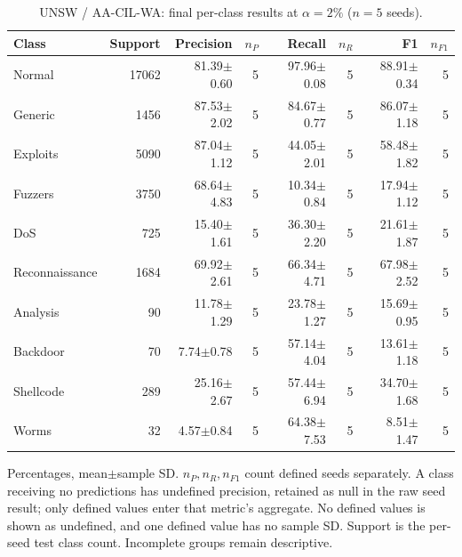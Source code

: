 \begin{table}[t]
\centering\scriptsize
\setlength{\tabcolsep}{3.3pt}
\caption{UNSW / AA-CIL-WA: final per-class results at $\alpha=2\%$ ($n=5$ seeds).}\label{tab:forgetting-class-unsw_nb15-aacil-wa}
\begin{tabular}{lrrrrrrr}
\toprule
Class & Support & Precision & $n_P$ & Recall & $n_R$ & F1 & $n_{F1}$ \\
\midrule
Normal & 17062 & 81.39$\pm$0.60 & 5 & 97.96$\pm$0.08 & 5 & 88.91$\pm$0.34 & 5 \\
Generic & 1456 & 87.53$\pm$2.02 & 5 & 84.67$\pm$0.77 & 5 & 86.07$\pm$1.18 & 5 \\
Exploits & 5090 & 87.04$\pm$1.12 & 5 & 44.05$\pm$2.01 & 5 & 58.48$\pm$1.82 & 5 \\
Fuzzers & 3750 & 68.64$\pm$4.83 & 5 & 10.34$\pm$0.84 & 5 & 17.94$\pm$1.12 & 5 \\
DoS & 725 & 15.40$\pm$1.61 & 5 & 36.30$\pm$2.20 & 5 & 21.61$\pm$1.87 & 5 \\
Reconnaissance & 1684 & 69.92$\pm$2.61 & 5 & 66.34$\pm$4.71 & 5 & 67.98$\pm$2.52 & 5 \\
Analysis & 90 & 11.78$\pm$1.29 & 5 & 23.78$\pm$1.27 & 5 & 15.69$\pm$0.95 & 5 \\
Backdoor & 70 & 7.74$\pm$0.78 & 5 & 57.14$\pm$4.04 & 5 & 13.61$\pm$1.18 & 5 \\
Shellcode & 289 & 25.16$\pm$2.67 & 5 & 57.44$\pm$6.94 & 5 & 34.70$\pm$1.68 & 5 \\
Worms & 32 & 4.57$\pm$0.84 & 5 & 64.38$\pm$7.53 & 5 & 8.51$\pm$1.47 & 5 \\
\bottomrule
\end{tabular}
\par\smallskip\begin{minipage}{0.98\textwidth}\scriptsize Percentages, mean$\pm$sample SD. $n_P,n_R,n_{F1}$ count defined seeds separately. A class receiving no predictions has undefined precision, retained as null in the raw seed result; only defined values enter that metric's aggregate. No defined values is shown as undefined, and one defined value has no sample SD. Support is the per-seed test class count. Incomplete groups remain descriptive.\end{minipage}
\end{table}

